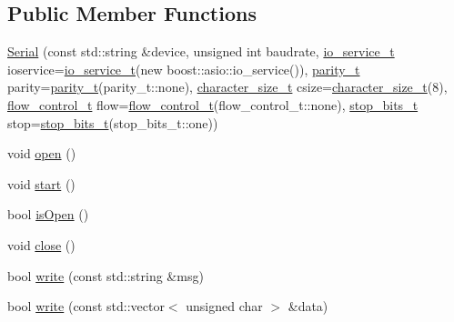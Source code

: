 \subsection*{Public Member Functions}
\begin{DoxyCompactItemize}
\item 
\hyperlink{classo_cpt_1_1protocol_1_1_serial_ac6137f4499128a58dec0c6848ffeb733}{Serial} (const std\+::string \&device, unsigned int baudrate, \hyperlink{classo_cpt_1_1protocol_1_1_serial_ac9305799ef4be4eb50f1274184492f04}{io\+\_\+service\+\_\+t} ioservice=\hyperlink{classo_cpt_1_1protocol_1_1_serial_ac9305799ef4be4eb50f1274184492f04}{io\+\_\+service\+\_\+t}(new boost\+::asio\+::io\+\_\+service()), \hyperlink{classo_cpt_1_1protocol_1_1_serial_aae21a39fe2f321475ca19d46bf40d5f3}{parity\+\_\+t} parity=\hyperlink{classo_cpt_1_1protocol_1_1_serial_aae21a39fe2f321475ca19d46bf40d5f3}{parity\+\_\+t}(parity\+\_\+t\+::none), \hyperlink{classo_cpt_1_1protocol_1_1_serial_a8799e83d5d812132c296dd4a6a17d6f6}{character\+\_\+size\+\_\+t} csize=\hyperlink{classo_cpt_1_1protocol_1_1_serial_a8799e83d5d812132c296dd4a6a17d6f6}{character\+\_\+size\+\_\+t}(8), \hyperlink{classo_cpt_1_1protocol_1_1_serial_ad32f1d64fb16a5443d7aae92e8b14232}{flow\+\_\+control\+\_\+t} flow=\hyperlink{classo_cpt_1_1protocol_1_1_serial_ad32f1d64fb16a5443d7aae92e8b14232}{flow\+\_\+control\+\_\+t}(flow\+\_\+control\+\_\+t\+::none), \hyperlink{classo_cpt_1_1protocol_1_1_serial_aadc4c803ade35920211e6c6a202a8c1f}{stop\+\_\+bits\+\_\+t} stop=\hyperlink{classo_cpt_1_1protocol_1_1_serial_aadc4c803ade35920211e6c6a202a8c1f}{stop\+\_\+bits\+\_\+t}(stop\+\_\+bits\+\_\+t\+::one))
\item 
void \hyperlink{classo_cpt_1_1protocol_1_1_serial_a7738b1566f37b36c97055a8800482a10}{open} ()
\item 
void \hyperlink{classo_cpt_1_1protocol_1_1_serial_a6231948447729037b55df7531065749f}{start} ()
\item 
bool \hyperlink{classo_cpt_1_1protocol_1_1_serial_ab63afb811bbfd0da9cba8a4edf8d76fe}{is\+Open} ()
\item 
void \hyperlink{classo_cpt_1_1protocol_1_1_serial_a8c7e9cd0aaa7c31893cf4380e8148fec}{close} ()
\item 
bool \hyperlink{classo_cpt_1_1protocol_1_1_serial_aa8e04c844af565e2532e771002a5a654}{write} (const std\+::string \&msg)
\item 
bool \hyperlink{classo_cpt_1_1protocol_1_1_serial_ae99cac9dc20997ca09742df8d1bc6091}{write} (const std\+::vector$<$ unsigned char $>$ \&data)
\item 

\end{DoxyCompactItemize}
